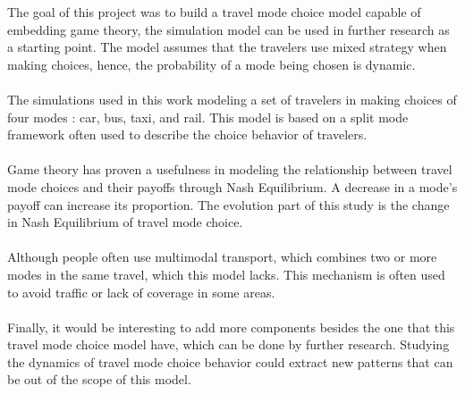 The goal of this project was to build a travel mode choice model capable of embedding game theory, the simulation model can be used in further research as a starting point. The model assumes that the travelers use mixed strategy when making choices, hence, the probability of a mode being chosen is dynamic. 
\paragraph{}
The simulations used in this work modeling a set of travelers in making choices of four modes : car, bus, taxi, and rail. This model is based on a split mode framework often used to describe the choice behavior of travelers.
\paragraph{}
Game theory has proven a usefulness in modeling the relationship between travel mode choices and their payoffs through Nash Equilibrium. A decrease in a mode's payoff can increase its proportion. The evolution part of this study is the change in Nash Equilibrium of travel mode choice.
\paragraph{}
Although people often use multimodal transport, which combines two or more modes in the same travel, which this model lacks. This mechanism is often used to avoid traffic or lack of coverage in some areas.
\paragraph{}Finally, it would be interesting to add more components besides the one that this travel mode choice model have, which can be done by further research. Studying the dynamics of travel mode choice behavior could extract new patterns that can be out of the scope of this model.